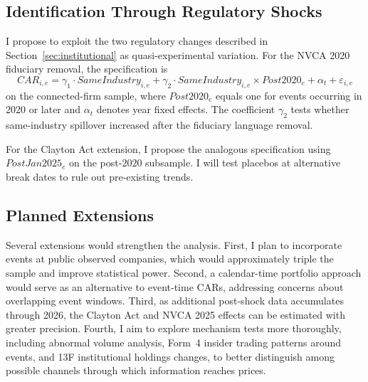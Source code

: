 \subsection{Identification Through Regulatory Shocks}

I propose to exploit the two regulatory changes described in Section~\ref{sec:institutional} as quasi-experimental variation. For the NVCA 2020 fiduciary removal, the specification is
\begin{equation}
\label{eq:nvca}
CAR_{i,e} = \gamma_1 \cdot SameIndustry_{i,e} + \gamma_2 \cdot SameIndustry_{i,e} \times Post2020_e + \alpha_t + \varepsilon_{i,e}
\end{equation}
on the connected-firm sample, where $Post2020_e$ equals one for events occurring in 2020 or later and $\alpha_t$ denotes year fixed effects. The coefficient $\gamma_2$ tests whether same-industry spillover increased after the fiduciary language removal.

For the Clayton Act extension, I propose the analogous specification using $PostJan2025_e$ on the post-2020 subsample. I will test placebos at alternative break dates to rule out pre-existing trends.

\subsection{Planned Extensions}



Several extensions would strengthen the analysis. First, I plan to incorporate events at public observed companies, which would approximately triple the sample and improve statistical power. Second, a calendar-time portfolio approach would serve as an alternative to event-time CARs, addressing concerns about overlapping event windows. Third, as additional post-shock data accumulates through 2026, the Clayton Act and NVCA 2025 effects can be estimated with greater precision. Fourth, I aim to explore mechanism tests more thoroughly, including abnormal volume analysis, Form~4 insider trading patterns around events, and 13F institutional holdings changes, to better distinguish among possible channels through which information reaches prices.